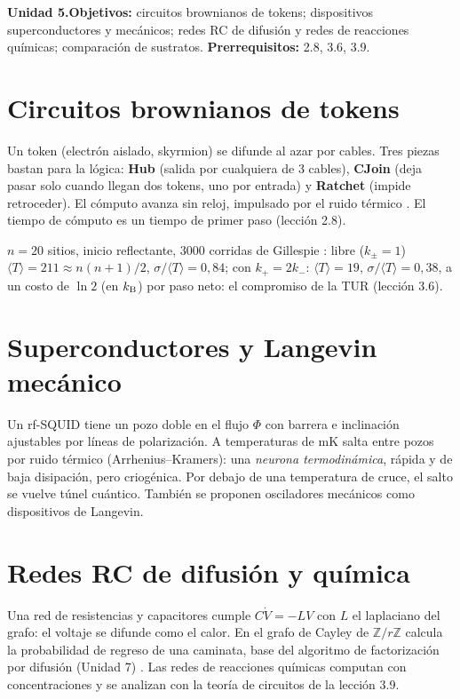 \documentclass[11pt,a4paper]{article}
\begin{document}

\noindent\textbf{Unidad 5.}\quad\textbf{Objetivos:} circuitos brownianos de tokens; dispositivos superconductores y mecánicos; redes RC de difusión y
redes de reacciones químicas; comparación de sustratos.
\textbf{Prerrequisitos:} 2.8, 3.6, 3.9.

\section{Circuitos brownianos de tokens}
Un token (electrón aislado, skyrmion) se difunde al azar por cables. Tres piezas bastan para la lógica: \textbf{Hub} (salida por cualquiera de 3 cables),
\textbf{CJoin} (deja pasar solo cuando llegan dos tokens, uno por entrada) y \textbf{Ratchet} (impide retroceder). El cómputo avanza sin reloj,
impulsado por el ruido térmico \cite{utsumi}. El tiempo de cómputo es un tiempo de primer paso (lección 2.8).
\begin{ejemplo}
$n=20$ sitios, inicio reflectante, 3000 corridas de Gillespie \evS: libre ($k_\pm=1$) $\langle T\rangle=211\approx n(n+1)/2$, $\sigma/\langle T\rangle=0{,}84$;
con $k_+=2k_-$: $\langle T\rangle=19$, $\sigma/\langle T\rangle=0{,}38$, a un costo de $\ln2$ (en $k_{\mathrm B}$) por paso neto: el compromiso de la TUR (lección 3.6).
\end{ejemplo}

\section{Superconductores y Langevin mecánico}
Un rf-SQUID tiene un pozo doble en el flujo $\Phi$ con barrera e inclinación ajustables por líneas de polarización. A temperaturas de mK salta entre pozos
por ruido térmico (Arrhenius--Kramers): una \emph{neurona termodinámica}, rápida y de baja disipación, pero criogénica. Por debajo de una temperatura de
cruce, el salto se vuelve túnel cuántico. También se proponen osciladores mecánicos como dispositivos de Langevin.

\section{Redes RC de difusión y química}
Una red de resistencias y capacitores cumple $C\dot V=-LV$ con $L$ el laplaciano del grafo: el voltaje se difunde como el calor. En el grafo de Cayley de
$\mathbb Z/r\mathbb Z$ calcula la probabilidad de regreso de una caminata, base del algoritmo de factorización por difusión (Unidad 7) \cite{cadavid}.
Las redes de reacciones químicas computan con concentraciones y se analizan con la teoría de circuitos de la lección 3.9.
\end{document}
